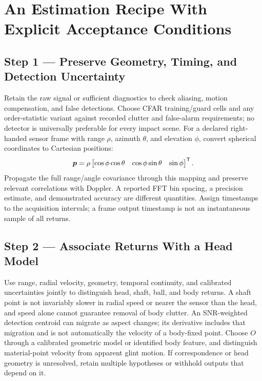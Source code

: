 \section{An Estimation Recipe With Explicit Acceptance Conditions}
\label{sec:screw-recipe}

\subsection*{Step 1 --- Preserve Geometry, Timing, and Detection Uncertainty}

Retain the raw signal or sufficient diagnostics to check aliasing, motion compensation, and false detections.
Choose CFAR training/guard cells and any order-statistic variant against recorded clutter and false-alarm requirements; no detector is universally preferable for every impact scene.
For a declared right-handed sensor frame with range $\rho$, azimuth $\theta$, and elevation $\phi$, convert spherical coordinates to Cartesian positions:
\begin{equation}
\bm{p}=\rho\begin{bmatrix}\cos\phi\cos\theta&\cos\phi\sin\theta&\sin\phi\end{bmatrix}^{\mathsf T}.
\end{equation}
Propagate the full range/angle covariance through this mapping and preserve relevant correlations with Doppler.
A reported FFT bin spacing, a precision estimate, and demonstrated accuracy are different quantities.
Assign timestamps to the acquisition intervals; a frame output timestamp is not an instantaneous sample of all returns.

\subsection*{Step 2 --- Associate Returns With a Head Model}

Use range, radial velocity, geometry, temporal continuity, and calibrated uncertainties jointly to distinguish head, shaft, ball, and body returns.
A shaft point is not invariably slower in radial speed or nearer the sensor than the head, and speed alone cannot guarantee removal of body clutter.
An SNR-weighted detection centroid can migrate as aspect changes; its derivative includes that migration and is not automatically the velocity of a body-fixed point.
Choose $O$ through a calibrated geometric model or identified body feature, and distinguish material-point velocity from apparent glint motion.
If correspondence or head geometry is unresolved, retain multiple hypotheses or withhold outputs that depend on it.

